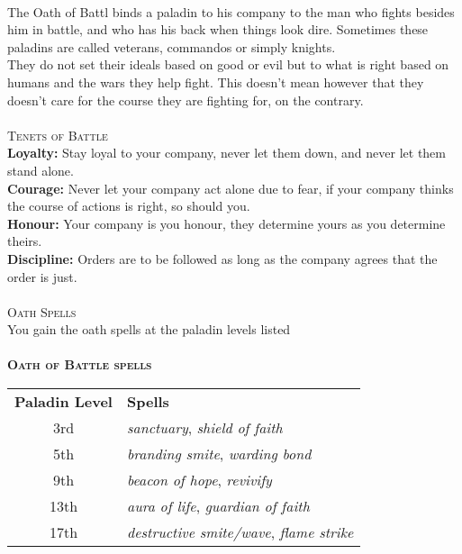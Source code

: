 \documentclass[22pt,a4paper,twocolumn]{article}
\begin{document}
\\
The Oath of Battl binds a paladin to his company to the man who fights besides him in battle, and who has his back when things look dire. Sometimes these paladins are called veterans, commandos or simply knights.\\
\indent They do not set their ideals based on good or evil but to what is right based on humans and the wars they help fight. This doesn't mean however that they doesn't care for the course they are fighting for, on the contrary.\\
\\
{\fontsize{18pt}{18pt}\textcolor{title}{\textsc{Tenets of Battle}}}\\
\textbf{Loyalty:} Stay loyal to your company, never let them down, and never let them stand alone.\\
\textbf{Courage:} Never let your company act alone due to fear, if your company thinks the course of actions is right, so should you.\\
\textbf{Honour:} Your company is you honour, they determine yours as you determine theirs.\\
\textbf{Discipline:} Orders are to be followed as long as the company agrees that the order is just.\\
\\
{\fontsize{18pt}{18pt}\textcolor{title}{\textsc{Oath Spells}}}\\
You gain the oath spells at the paladin levels listed\\
\\
{\fontsize{16pt}{16pt}\textsc{\textbf{Oath of Battle spells}}}\\
\begin{tabular}{cp{6cm}}
{\bf Paladin Level} & {\bf Spells}                         \\
\rowcolor[HTML]{B8EFAD} 
3rd                 & \textit{sanctuary}, \textit{shield of faith}\\
5th                 & \textit{branding smite}, \textit{warding bond}\\
\rowcolor[HTML]{B8EFAD} 
9th                 & \textit{beacon of hope}, \textit{revivify}\\
13th                & \textit{aura of life}, \textit{guardian of faith}\\
\rowcolor[HTML]{B8EFAD} 
17th                & \textit{destructive smite/wave}, \textit{flame strike}
\end{tabular}\\\\
\end{document}
